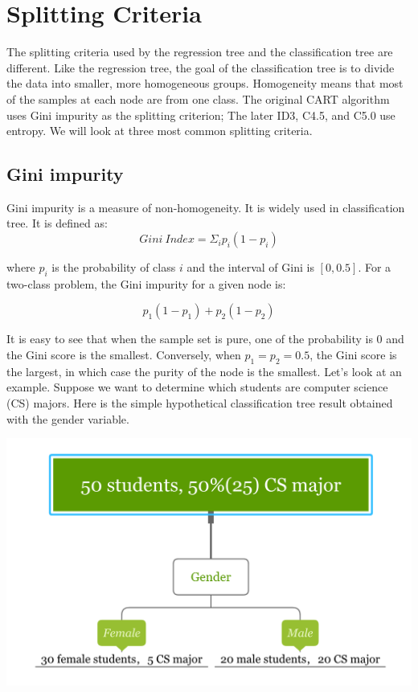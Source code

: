 \documentclass[
  12pt,
]{krantz}
\begin{document}
\hypertarget{splitting-criteria}{%
\section{Splitting Criteria}\label{splitting-criteria}}

The splitting criteria used by the regression tree and the classification tree are different. Like the regression tree, the goal of the classification tree is to divide the data into smaller, more homogeneous groups. Homogeneity means that most of the samples at each node are from one class. The original CART algorithm uses Gini impurity as the splitting criterion; The later ID3, C4.5, and C5.0 use entropy. We will look at three most common splitting criteria.

\hypertarget{gini-impurity}{%
\subsection{Gini impurity}\label{gini-impurity}}

Gini impurity \citep{Breiman1984} is a measure of non-homogeneity. It is widely used in classification tree. It is defined as:
\[Gini\ Index = \Sigma_i p_i(1-p_i)\]

where \(p_i\) is the probability of class \(i\) and the interval of Gini is \([0, 0.5]\). For a two-class problem, the Gini impurity for a given node is:

\[p_{1}(1-p_{1})+p_{2}(1-p_{2})\]

It is easy to see that when the sample set is pure, one of the probability is 0 and the Gini score is the smallest. Conversely, when \(p_{1} = p_{2} = 0.5\), the Gini score is the largest, in which case the purity of the node is the smallest. Let's look at an example. Suppose we want to determine which students are computer science (CS) majors. Here is the simple hypothetical classification tree result obtained with the gender variable.

\includegraphics{images/giniEN.PNG}
\end{document}
